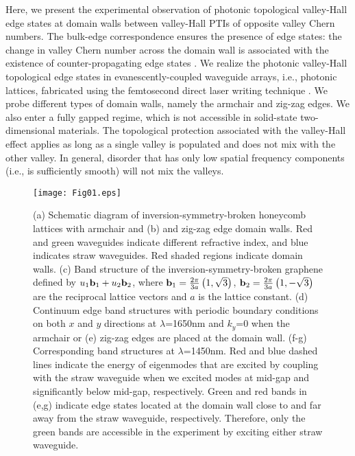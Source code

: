 \documentclass[prl,twocolumn,showpacs,amsmath,amssymb,superscriptaddress]{revtex4-1}
\begin{document}
Here, we present the experimental observation of photonic topological valley-Hall edge states at domain walls between valley-Hall PTIs of opposite valley Chern numbers.
The bulk-edge correspondence ensures the presence of edge states: the change in valley Chern number across the domain wall is associated with the existence of counter-propagating edge states \cite{Mong2011,Delplace2011,Ju2015}.
We realize the photonic valley-Hall topological edge states in evanescently-coupled waveguide arrays, i.e., photonic lattices, fabricated using the femtosecond direct laser writing technique \cite{Szameit2010}.
We probe different types of domain walls, namely the armchair and zig-zag edges. We also enter a fully gapped regime, which is not accessible in solid-state two-dimensional materials.
The topological protection associated with the valley-Hall effect applies as long as a single valley is populated and does not mix with the other valley. In general, disorder that has only low spatial frequency components (i.e., is sufficiently smooth) will not mix the valleys.
\begin{figure*}[htbp]
	\centering
	\texttt{[image: Fig01.eps]}
	\caption{(a) Schematic diagram of inversion-symmetry-broken honeycomb lattices with armchair and (b) and zig-zag edge domain walls. Red and green waveguides indicate different refractive index, and blue indicates straw waveguides. Red shaded regions indicate domain walls. (c) Band structure of the inversion-symmetry-broken graphene defined by $u_{1}\textbf{\textrm{b}}_{1}+u_{2}\textbf{\textrm{b}}_{2}$, where $\textbf{\textrm{b}}_{1}=\frac{2\pi}{3a}\left(1,\sqrt{3}\right)$, $\textbf{\textrm{b}}_{2}=\frac{2\pi}{3a}\left(1,-\sqrt{3}\right)$ are the reciprocal lattice vectors and $a$ is the lattice constant. (d) Continuum edge band structures with periodic boundary conditions on both $x$ and $y$ directions at $\lambda$=1650nm and $k_{y}$=0 when the armchair or (e) zig-zag edges are placed at the domain wall. (f-g) Corresponding band structures at $\lambda$=1450nm. Red and blue dashed lines indicate the energy of eigenmodes that are excited by coupling with the straw waveguide when we excited modes at mid-gap and significantly below mid-gap, respectively.  Green and red bands in (e,g) indicate edge states located at the domain wall close to and far away from the straw waveguide, respectively. Therefore, only the green bands are accessible in the experiment by exciting either straw waveguide.}
	\label{Fig_01}
\end{figure*}
\end{document}
